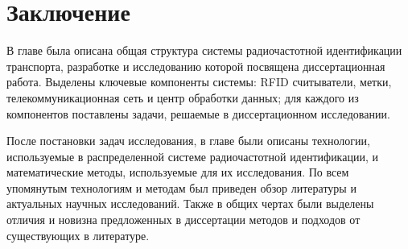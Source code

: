 \section{Заключение}\label{sec:ch1_conclusion}

В главе была описана общая структура системы радиочастотной идентификации транспорта, разработке и исследованию которой посвящена диссертационная работа. Выделены ключевые компоненты системы: RFID считыватели, метки, телекоммуникационная сеть и центр обработки данных; для каждого из компонентов поставлены задачи, решаемые в диссертационном исследовании.

После постановки задач исследования, в главе были описаны технологии, используемые в распределенной системе радиочастотной идентификации, и математические методы, используемые для их исследования. По всем упомянутым технологиям и методам был приведен обзор литературы и актуальных научных исследований. Также в общих чертах были выделены отличия и новизна предложенных в диссертации методов и подходов от существующих в литературе.







